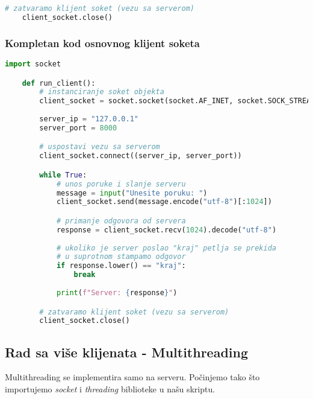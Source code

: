 \vspace{0.5cm}

\begin{lstlisting}[language = Python]
    # zatvaramo klijent soket (vezu sa serverom)
    client_socket.close()
\end{lstlisting}

\subsubsection{Kompletan kod osnovnog klijent soketa}

\vspace{0.5cm}

\begin{lstlisting}[language = Python]
    import socket

    def run_client():
        # instanciranje soket objekta
        client_socket = socket.socket(socket.AF_INET, socket.SOCK_STREAM)
        
        server_ip = "127.0.0.1"
        server_port = 8000

        # uspostavi vezu sa serverom
        client_socket.connect((server_ip, server_port))

        while True:
            # unos poruke i slanje serveru
            message = input("Unesite poruku: ")
            client_socket.send(message.encode("utf-8")[:1024])

            # primanje odgovora od servera
            response = client_socket.recv(1024).decode("utf-8")
        
            # ukoliko je server poslao "kraj" petlja se prekida
            # u suprotnom stampamo odgovor
            if response.lower() == "kraj":
                break
        
            print(f"Server: {response}")

        # zatvaramo klijent soket (vezu sa serverom)
        client_socket.close()
\end{lstlisting}

\subsection{Rad sa više klijenata - Multithreading}

Multithreading se implementira samo na serveru. Počinjemo tako što importujemo \emph{socket} i \emph{threading} biblioteke u našu skriptu.

\vspace{0.5cm}

